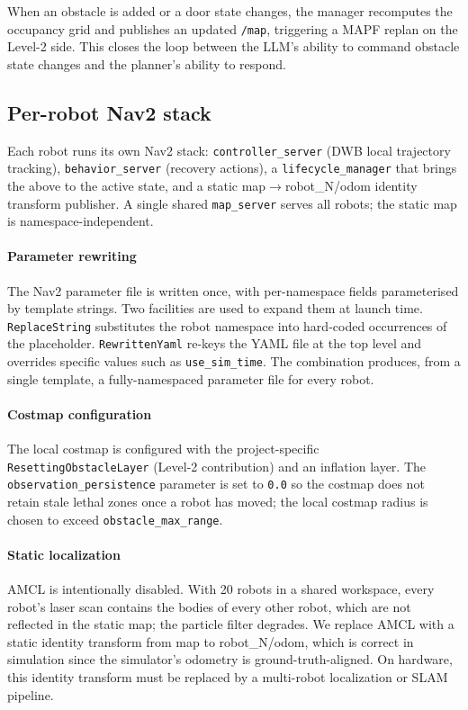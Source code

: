 \documentclass[conference]{IEEEtran}
\begin{document}
When an obstacle is added or a door state changes, the manager
recomputes the occupancy grid and publishes an updated
\texttt{/map}, triggering a MAPF replan on the Level-2 side.
This closes the loop between the LLM's ability to command
obstacle state changes and the planner's ability to respond.

\subsection{Per-robot Nav2 stack}
\label{sec:method:nav2}

Each robot runs its own Nav2 stack:
\texttt{controller\_server} (DWB local trajectory tracking),
\texttt{behavior\_server} (recovery actions), a
\texttt{lifecycle\_manager} that brings the above to the
\textsf{active} state, and a static
\textsf{map}$\to$\textsf{robot\_N/odom} identity transform
publisher. A single shared \texttt{map\_server} serves all
robots; the static map is namespace-independent.

\paragraph{Parameter rewriting}
The Nav2 parameter file is written once, with per-namespace
fields parameterised by template strings. Two facilities are
used to expand them at launch time. \texttt{ReplaceString}
substitutes the robot namespace into hard-coded occurrences of
the placeholder. \texttt{RewrittenYaml} re-keys the YAML file
at the top level and overrides specific values such as
\texttt{use\_sim\_time}. The combination produces, from a
single template, a fully-namespaced parameter file for every
robot.

\paragraph{Costmap configuration}
The local costmap is configured with the project-specific
\texttt{ResettingObstacleLayer} (Level-2 contribution) and an
inflation layer. The \texttt{observation\_persistence}
parameter is set to \texttt{0.0} so the costmap does not
retain stale lethal zones once a robot has moved; the local
costmap radius is chosen to exceed
\texttt{obstacle\_max\_range}.

\paragraph{Static localization}
AMCL is intentionally disabled. With 20 robots in a shared
workspace, every robot's laser scan contains the bodies of
every other robot, which are not reflected in the static map;
the particle filter degrades. We replace AMCL with a static
identity transform from \textsf{map} to
\textsf{robot\_N/odom}, which is correct in simulation since
the simulator's odometry is ground-truth-aligned. On hardware,
this identity transform must be replaced by a multi-robot
localization or SLAM pipeline.
\end{document}
